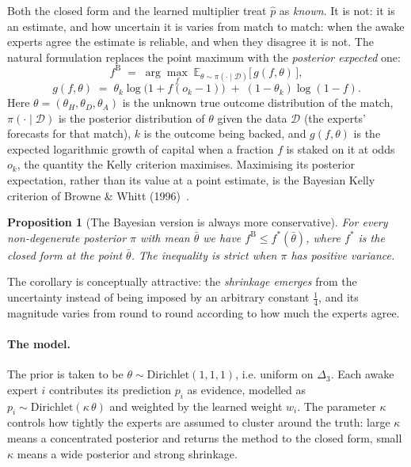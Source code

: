 \documentclass[12pt,a4paper,oneside]{report}
\renewcommand{\_}{\oldunderscore\allowbreak}
\theoremstyle{definition}
\theoremstyle{plain}
\newtheorem{proposition}[theorem]{Proposition}
\theoremstyle{definition}   %
\begin{document}
Both the closed form and the learned multiplier treat $\hat{p}$ as \emph{known}. It is not: it is
an estimate, and how uncertain it is varies from match to match: when the awake experts agree
the estimate is reliable, and when they disagree it is not. The natural formulation replaces the
point maximum with the \emph{posterior expected} one: \[ f^{\mathrm{B}} \;=\; \arg\max_{f} \;
\mathbb{E}_{\theta \sim \pi(\cdot\mid\mathcal{D})} \big[\, g(f,\theta) \,\big], \] \[
g(f,\theta) \;=\; \theta_k \log\big(1+f(o_k-1)\big) \;+\; (1-\theta_k)\log(1-f). \]
Here $\theta = (\theta_H, \theta_D, \theta_A)$ is the unknown true outcome distribution of the match,
$\pi(\cdot\mid\mathcal{D})$ is the posterior distribution of $\theta$ given the data $\mathcal{D}$ (the
experts' forecasts for that match), $k$ is the outcome being backed, and $g(f,\theta)$ is the
expected logarithmic growth of capital when a fraction $f$ is staked on it at odds $o_k$, the
quantity the Kelly criterion maximises. Maximising its posterior expectation, rather than its
value at a point estimate, is the Bayesian Kelly criterion of Browne \& Whitt
(1996)~\cite{brownewhitt1996}.

\begin{proposition}[The Bayesian version is always more conservative]
\label{prop:bayes-conservative}
For every non-degenerate posterior $\pi$ with mean $\bar{\theta}$ we have
$f^{\mathrm{B}} \leq f^{*}(\bar{\theta})$, where $f^{*}$ is the closed form at the point
$\bar{\theta}$. The inequality is strict when $\pi$ has positive variance.
\end{proposition}

The corollary is conceptually attractive: the \emph{shrinkage emerges} from the uncertainty
instead of being imposed by an arbitrary constant $\tfrac14$, and its magnitude varies from round
to round according to how much the experts agree.

\paragraph{The model.} The prior is taken to be $\theta \sim \mathrm{Dirichlet}(1,1,1)$, i.e.
uniform on $\Delta_3$. Each awake expert $i$ contributes its prediction $p_i$ as evidence,
modelled as $p_i \sim \mathrm{Dirichlet}(\kappa\,\theta)$ and weighted by the learned weight
$w_i$. The parameter $\kappa$ controls how tightly the experts are assumed to cluster around the
truth: large $\kappa$ means a concentrated posterior and returns the method to the closed form,
small $\kappa$ means a wide posterior and strong shrinkage.
\end{document}
